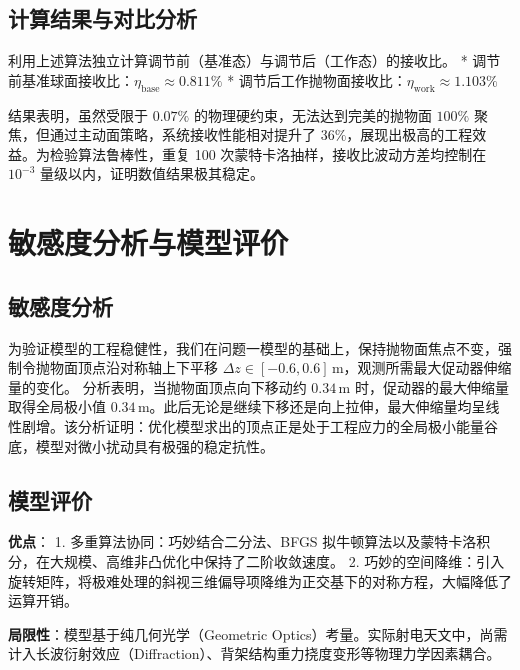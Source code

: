 \documentclass[UTF8,a4paper,zihao=-4]{ctexart}
\begin{document}
\subsection{计算结果与对比分析}
利用上述算法独立计算调节前（基准态）与调节后（工作态）的接收比。
*  调节前基准球面接收比：$\eta_{\mathrm{base}} \approx 0.811\%$
*  调节后工作抛物面接收比：$\eta_{\mathrm{work}} \approx 1.103\%$

结果表明，虽然受限于 $0.07\%$ 的物理硬约束，无法达到完美的抛物面 $100\%$ 聚焦，但通过主动面策略，系统接收性能相对提升了 $36\%$，展现出极高的工程效益。为检验算法鲁棒性，重复 100 次蒙特卡洛抽样，接收比波动方差均控制在 $10^{-3}$ 量级以内，证明数值结果极其稳定。

\section{敏感度分析与模型评价}

\subsection{敏感度分析}
为验证模型的工程稳健性，我们在问题一模型的基础上，保持抛物面焦点不变，强制令抛物面顶点沿对称轴上下平移 $\Delta z \in [-0.6, 0.6]\,\mathrm{m}$，观测所需最大促动器伸缩量的变化。
分析表明，当抛物面顶点向下移动约 $0.34\,\mathrm{m}$ 时，促动器的最大伸缩量取得全局极小值 $0.34\,\mathrm{m}$。此后无论是继续下移还是向上拉伸，最大伸缩量均呈线性剧增。该分析证明：优化模型求出的顶点正是处于工程应力的全局极小能量谷底，模型对微小扰动具有极强的稳定抗性。

\subsection{模型评价}
\textbf{优点}：
1. 多重算法协同：巧妙结合二分法、BFGS 拟牛顿算法以及蒙特卡洛积分，在大规模、高维非凸优化中保持了二阶收敛速度。
2. 巧妙的空间降维：引入旋转矩阵，将极难处理的斜视三维偏导项降维为正交基下的对称方程，大幅降低了运算开销。

\textbf{局限性}：模型基于纯几何光学（Geometric Optics）考量。实际射电天文中，尚需计入长波衍射效应（Diffraction）、背架结构重力挠度变形等物理力学因素耦合。
\end{document}
